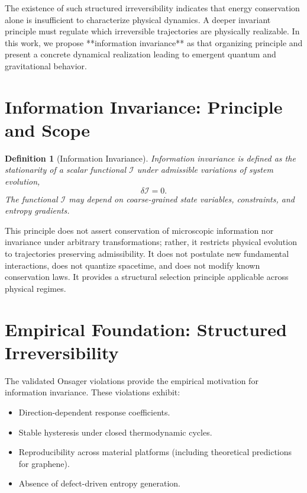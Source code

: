 \documentclass[prd,10pt,twocolumn]{revtex4-2}
\newtheorem{definition}[theorem]{Definition}
\newcommand{\cI}{\mathcal{I}}
\begin{document}
The existence of such structured irreversibility indicates that energy conservation alone is insufficient to characterize physical dynamics. A deeper invariant principle must regulate which irreversible trajectories are physically realizable. In this work, we propose **information invariance** as that organizing principle and present a concrete dynamical realization leading to emergent quantum and gravitational behavior.

\section{Information Invariance: Principle and Scope}
\label{sec:info_inv}

\begin{definition}[Information Invariance]
Information invariance is defined as the stationarity of a scalar functional $\cI$ under admissible variations of system evolution,
\begin{equation}
\delta \cI = 0. \label{eq:info_inv}
\end{equation}
The functional $\cI$ may depend on coarse-grained state variables, constraints, and entropy gradients.
\end{definition}

This principle does not assert conservation of microscopic information nor invariance under arbitrary transformations; rather, it restricts physical evolution to trajectories preserving admissibility. It does not postulate new fundamental interactions, does not quantize spacetime, and does not modify known conservation laws. It provides a structural selection principle applicable across physical regimes.

\section{Empirical Foundation: Structured Irreversibility}
\label{sec:motivation}

The validated Onsager violations \cite{Dabas2024preprint} provide the empirical motivation for information invariance. These violations exhibit:

\begin{itemize}
    \item Direction-dependent response coefficients.
    \item Stable hysteresis under closed thermodynamic cycles.
    \item Reproducibility across material platforms (including theoretical predictions for graphene).
    \item Absence of defect-driven entropy generation.
\end{itemize}
\end{document}
